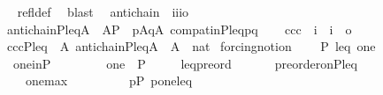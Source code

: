 \begin{isabellebody}
%
\isadelimproof
\ \ %
\endisadelimproof
%
\isatagproof
{}\isamarkupfalse%
\ refl{\isacharunderscore}{\kern0pt}def\ \isamarkupfalse%
\ blast%
\endisatagproof
{\isafoldproof}%
%
\isadelimproof
\isanewline
%
\endisadelimproof
\isanewline
{}\isamarkupfalse%
\isanewline
\ \ antichain\ {\isacharcolon}{\kern0pt}{\isacharcolon}{\kern0pt}\ {\isachardoublequoteopen}i{\isasymRightarrow}i{\isasymRightarrow}i{\isasymRightarrow}o{\isachardoublequoteclose}\ \isanewline
\ \ {\isachardoublequoteopen}antichain{\isacharparenleft}{\kern0pt}P{\isacharcomma}{\kern0pt}leq{\isacharcomma}{\kern0pt}A{\isacharparenright}{\kern0pt}\ {\isasymequiv}\ A{\isasymsubseteq}P\ {\isasymand}\ {\isacharparenleft}{\kern0pt}{\isasymforall}p{\isasymin}A{\isachardot}{\kern0pt}{\isasymforall}q{\isasymin}A{\isachardot}{\kern0pt}{\isacharparenleft}{\kern0pt}{\isasymnot}\ compat{\isacharunderscore}{\kern0pt}in{\isacharparenleft}{\kern0pt}P{\isacharcomma}{\kern0pt}leq{\isacharcomma}{\kern0pt}p{\isacharcomma}{\kern0pt}q{\isacharparenright}{\kern0pt}{\isacharparenright}{\kern0pt}{\isacharparenright}{\kern0pt}{\isachardoublequoteclose}\isanewline
\isanewline
{}\isamarkupfalse%
\ \isanewline
\ \ ccc\ {\isacharcolon}{\kern0pt}{\isacharcolon}{\kern0pt}\ {\isachardoublequoteopen}i\ {\isasymRightarrow}\ i\ {\isasymRightarrow}\ o{\isachardoublequoteclose}\ \isanewline
\ \ {\isachardoublequoteopen}ccc{\isacharparenleft}{\kern0pt}P{\isacharcomma}{\kern0pt}leq{\isacharparenright}{\kern0pt}\ {\isasymequiv}\ {\isasymforall}A{\isachardot}{\kern0pt}\ antichain{\isacharparenleft}{\kern0pt}P{\isacharcomma}{\kern0pt}leq{\isacharcomma}{\kern0pt}A{\isacharparenright}{\kern0pt}\ {\isasymlongrightarrow}\ {\isacharbar}{\kern0pt}A{\isacharbar}{\kern0pt}\ {\isasymle}\ nat{\isachardoublequoteclose}\isanewline
\isanewline
{}\isamarkupfalse%
\ forcing{\isacharunderscore}{\kern0pt}notion\ {\isacharequal}{\kern0pt}\isanewline
\ \ \ P\ leq\ one\isanewline
\ \ \ one{\isacharunderscore}{\kern0pt}in{\isacharunderscore}{\kern0pt}P{\isacharcolon}{\kern0pt}\ \ \ \ \ \ \ \ \ {\isachardoublequoteopen}one\ {\isasymin}\ P{\isachardoublequoteclose}\isanewline
\ \ \ \ \ leq{\isacharunderscore}{\kern0pt}preord{\isacharcolon}{\kern0pt}\ \ \ \ \ \ \ {\isachardoublequoteopen}preorder{\isacharunderscore}{\kern0pt}on{\isacharparenleft}{\kern0pt}P{\isacharcomma}{\kern0pt}leq{\isacharparenright}{\kern0pt}{\isachardoublequoteclose}\isanewline
\ \ \ \ \ one{\isacharunderscore}{\kern0pt}max{\isacharcolon}{\kern0pt}\ \ \ \ \ \ \ \ \ \ {\isachardoublequoteopen}{\isasymforall}p{\isasymin}P{\isachardot}{\kern0pt}\ {\isasymlangle}p{\isacharcomma}{\kern0pt}one{\isasymrangle}{\isasymin}leq{\isachardoublequoteclose}\isanewline

\end{isabellebody}
